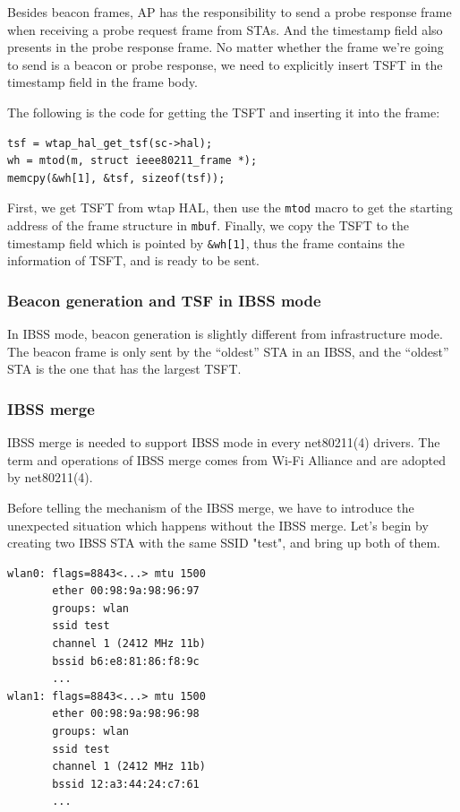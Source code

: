 \documentclass[conference]{IEEEtran}
\begin{document}
Besides beacon frames, AP has the responsibility to send a probe response frame when receiving a probe request frame from STAs. And the timestamp field also presents in the probe response frame. No matter whether the frame we’re going to send is a beacon or probe response, we need to explicitly insert TSFT in the timestamp field in the frame body.

The following is the code for getting the TSFT and inserting it into the frame:

\begin{lstlisting}
tsf = wtap_hal_get_tsf(sc->hal);
wh = mtod(m, struct ieee80211_frame *);
memcpy(&wh[1], &tsf, sizeof(tsf));
\end{lstlisting}

First, we get TSFT from wtap HAL, then use the \lstinline{mtod} macro to get the starting address of the frame structure in \lstinline{mbuf}. Finally, we copy the TSFT to the timestamp field which is pointed by \lstinline{&wh[1]}, thus the frame contains the information of TSFT, and is ready to be sent.

\subsubsection{Beacon generation and TSF in IBSS mode}
In IBSS mode, beacon generation is slightly different from infrastructure mode. The beacon frame is only sent by the “oldest” STA in an IBSS, and the “oldest” STA is the one that has the largest TSFT.

\subsubsection{IBSS merge}
IBSS merge is needed to support IBSS mode in every net80211(4) drivers. The term and operations of IBSS merge comes from Wi-Fi Alliance and are adopted by net80211(4).

Before telling the mechanism of the IBSS merge, we have to introduce the unexpected situation which happens without the IBSS merge. Let's begin by creating two IBSS STA with the same SSID "test", and bring up both of them. 

\begin{lstlisting}
wlan0: flags=8843<...> mtu 1500
       ether 00:98:9a:98:96:97
       groups: wlan
       ssid test 
       channel 1 (2412 MHz 11b) 
       bssid b6:e8:81:86:f8:9c
       ...
wlan1: flags=8843<...> mtu 1500
       ether 00:98:9a:98:96:98
       groups: wlan
       ssid test 
       channel 1 (2412 MHz 11b) 
       bssid 12:a3:44:24:c7:61
       ...
\end{lstlisting}
\end{document}

